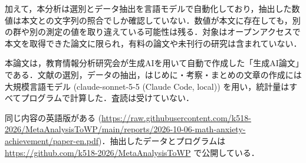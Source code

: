 \documentclass[
  lualatex, ja=standard, paper={182mm,257mm}, twocolumn, fontsize=8.5pt, baselineskip=13.5pt,
  line_length=24zw, column_gap=6.1mm, number_of_lines=45, head_space=24.5mm, gutter=16.25mm
]{jlreq}
\newcommand{\chapspaced}[1]{\par\vspace{13.5pt}\needspace{4\baselineskip}{\centering\gtfamily\bfseries #1\par}\nopagebreak}
\begin{document}
加えて，本分析は選別とデータ抽出を言語モデルで自動化しており，抽出した数値は本文との文字列の照合でしか確認していない．数値が本文に存在しても，別の群や別の測定の値を取り違えている可能性は残る．対象はオープンアクセスで本文を取得できた論文に限られ，有料の論文や未刊行の研究は含まれていない．

\chapspaced{付\hspace{1\zw}記}
本論文は，教育情報分析研究会が生成AIを用いて自動で作成した「生成AI論文」である．文献の選別，データの抽出，はじめに・考察・まとめの文章の作成には大規模言語モデル (claude-sonnet-5-5 (Claude Code, local)) を用い，統計量はすべてプログラムで計算した．査読は受けていない．

同じ内容の英語版がある (\url{https://raw.githubusercontent.com/k518-2026/MetaAnalysisToWP/main/reports/2026-10-06-math-anxiety-achievement/paper-en.pdf})．抽出したデータとプログラムは \url{https://github.com/k518-2026/MetaAnalysisToWP} で公開している．
\end{document}
